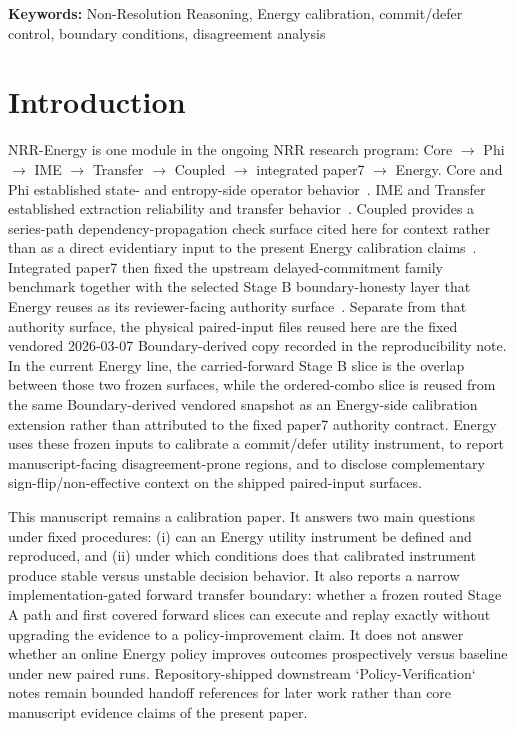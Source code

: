\documentclass[11pt,a4paper]{article}
\begin{document}
\noindent\textbf{Keywords:} Non-Resolution Reasoning, Energy calibration, commit/defer control, boundary conditions, disagreement analysis

\section{Introduction}
\label{sec:intro}

NRR-Energy is one module in the ongoing NRR research program:
Core $\rightarrow$ Phi $\rightarrow$ IME $\rightarrow$ Transfer $\rightarrow$ Coupled $\rightarrow$ integrated paper7 $\rightarrow$ Energy.
Core and Phi established state- and entropy-side operator behavior~\cite{saito2025nrr,saito2026phi}. IME and Transfer established extraction reliability and transfer behavior~\cite{saito2026ime,saito2026transfer}. Coupled provides a series-path dependency-propagation check surface cited here for context rather than as a direct evidentiary input to the present Energy calibration claims~\cite{saito2026coupled}. Integrated paper7 then fixed the upstream delayed-commitment family benchmark together with the selected Stage B boundary-honesty layer that Energy reuses as its reviewer-facing authority surface~\cite{saito2026principles}. Separate from that authority surface, the physical paired-input files reused here are the fixed vendored 2026-03-07 Boundary-derived copy recorded in the reproducibility note. In the current Energy line, the carried-forward Stage B slice is the overlap between those two frozen surfaces, while the ordered-combo slice is reused from the same Boundary-derived vendored snapshot as an Energy-side calibration extension rather than attributed to the fixed paper7 authority contract. Energy uses these frozen inputs to calibrate a commit/defer utility instrument, to report manuscript-facing disagreement-prone regions, and to disclose complementary sign-flip/non-effective context on the shipped paired-input surfaces.

This manuscript remains a calibration paper. It answers two main questions under fixed procedures: (i) can an Energy utility instrument be defined and reproduced, and (ii) under which conditions does that calibrated instrument produce stable versus unstable decision behavior. It also reports a narrow implementation-gated forward transfer boundary: whether a frozen routed Stage A path and first covered forward slices can execute and replay exactly without upgrading the evidence to a policy-improvement claim. It does not answer whether an online Energy policy improves outcomes prospectively versus baseline under new paired runs. Repository-shipped downstream `Policy-Verification` notes remain bounded handoff references for later work rather than core manuscript evidence claims of the present paper.
\end{document}
